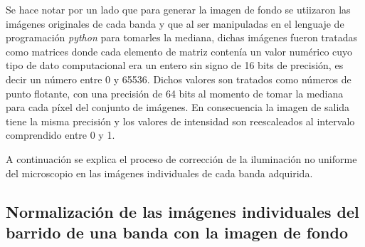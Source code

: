 Se hace notar por un lado que para generar la imagen de fondo se utiizaron las imágenes originales de cada banda y que al ser manipuladas en el lenguaje de programación \textit{python} para tomarles la mediana, dichas imágenes fueron tratadas como matrices donde cada elemento de matriz contenía un valor numérico cuyo tipo de dato computacional era un entero sin signo de 16 bits de precisión, es decir un número entre 0 y 65536. Dichos valores son tratados como números de punto flotante, con una precisión de 64 bits al momento de tomar la mediana para cada píxel del conjunto de imágenes. En consecuencia la imagen de salida tiene la misma precisión y los valores de intensidad son reescaleados al intervalo comprendido entre 0 y 1.

A continuación se explica el proceso de corrección de la iluminación no uniforme del microscopio en las imágenes individuales de cada banda adquirida.	
	
\singlespacing
\subsection{Normalización de las imágenes individuales del barrido de una banda con la imagen de fondo \href{https://github.com/jrr1984/defects_analysis/blob/master/MAIN/bg_normalization.py}{\faGithub}}

